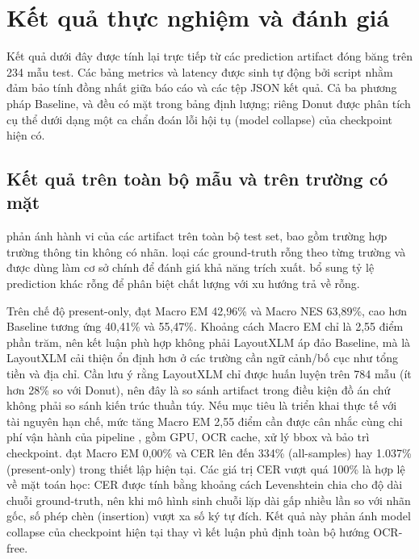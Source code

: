 \section{Kết quả thực nghiệm và đánh giá}
\label{sec:results}

Kết quả dưới đây được tính lại trực tiếp từ các prediction artifact đóng băng trên 234 mẫu test. Các bảng metrics và latency được sinh tự động bởi script  nhằm đảm bảo tính đồng nhất giữa báo cáo và các tệp JSON kết quả. Cả ba phương pháp Baseline,  và  đều có mặt trong bảng định lượng; riêng Donut được phân tích cụ thể dưới dạng một ca chẩn đoán lỗi hội tụ (model collapse) của checkpoint hiện có.

\subsection{Kết quả trên toàn bộ mẫu và trên trường có mặt}
\label{subsec:main_results}



 phản ánh hành vi của các artifact trên toàn bộ test set, bao gồm trường hợp trường thông tin không có nhãn.  loại các ground-truth rỗng theo từng trường và được dùng làm cơ sở chính để đánh giá khả năng trích xuất.  bổ sung tỷ lệ prediction khác rỗng để phân biệt chất lượng với xu hướng trả về rỗng.

Trên chế độ present-only,  đạt Macro EM 42,96\% và Macro NES 63,89\%, cao hơn Baseline tương ứng 40,41\% và 55,47\%. Khoảng cách Macro EM chỉ là 2,55 điểm phần trăm, nên kết luận phù hợp không phải LayoutXLM áp đảo Baseline, mà là LayoutXLM cải thiện ổn định hơn ở các trường cần ngữ cảnh/bố cục như tổng tiền và địa chỉ. Cần lưu ý rằng LayoutXLM chỉ được huấn luyện trên 784 mẫu (ít hơn 28\% so với Donut), nên đây là so sánh artifact trong điều kiện đồ án chứ không phải so sánh kiến trúc thuần túy. Nếu mục tiêu là triển khai thực tế với tài nguyên hạn chế, mức tăng Macro EM 2,55 điểm cần được cân nhắc cùng chi phí vận hành của pipeline , gồm GPU, OCR cache, xử lý bbox và bảo trì checkpoint.  đạt Macro EM 0,00\% và CER lên đến 334\% (all-samples) hay 1.037\% (present-only) trong thiết lập hiện tại. Các giá trị CER vượt quá 100\% là hợp lệ về mặt toán học: CER được tính bằng khoảng cách Levenshtein chia cho độ dài chuỗi ground-truth, nên khi mô hình sinh chuỗi lặp dài gấp nhiều lần so với nhãn gốc, số phép chèn (insertion) vượt xa số ký tự đích. Kết quả này phản ánh model collapse của checkpoint hiện tại thay vì kết luận phủ định toàn bộ hướng OCR-free.

